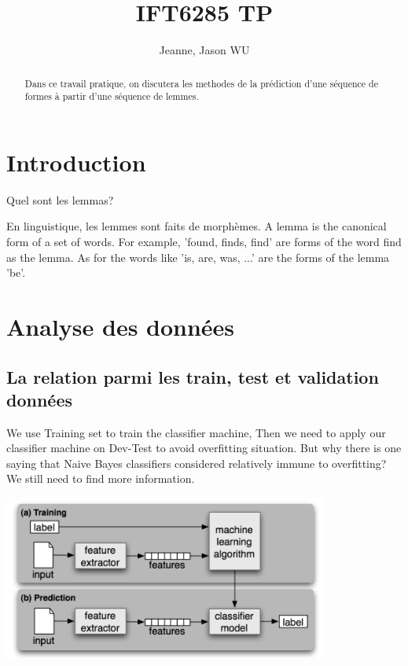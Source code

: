 \documentclass[a4paper]{article}
\title{IFT6285 TP}
\author{Jeanne, Jason WU}
\begin{document}
\maketitle

\begin{abstract}
Dans ce travail pratique,  on discutera les methodes de la prédiction d'une séquence de formes à partir d'une séquence de lemmes.
\end{abstract}

\section{Introduction}
Quel sont les lemmas?

En linguistique, les lemmes sont faits de morphèmes. A lemma is the canonical form of a set of words. For example, 'found, finds, find' are forms of the word find as the lemma. As for the words like 'is, are, was, ...' are the forms of the lemma 'be'.

\section{Analyse des données}

\subsection{La relation parmi les train, test et validation données}

We use Training set to train the classifier machine, Then we need to apply our classifier machine on Dev-Test to avoid overfitting situation. But why there is one saying that Naive Bayes classifiers considered relatively immune to overfitting? We still need to find more information.

\begin{center}
\includegraphics[width=0.8\textwidth]{process_flow.png}
\end{center}
\end{document}
